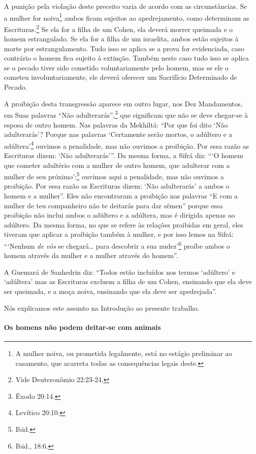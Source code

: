 A punição pela violação deste preceito varia de acordo com as
circunstâncias. Se a mulher for noiva\footnote{A mulher noiva, ou prometida legalmente, está no estágio preliminar ao casamento, que acarreta todas as consequências legais deste.} ambos ficam
sujeitos ao apedrejamento, como determinam as
Escrituras.\footnote{Vide Deuteronômio 22:23-24.} Se ela for a filha de um Cohen,
ela deverá morrer queimada e o homem estrangulado. Se ela for a filha de
um israelita, ambos estão sujeitos à morte por estrangulamento. Tudo
isso se aplica se a prova for evidenciada, caso contrário o homem fica
sujeito à extinção. Também neste caso tudo isso se aplica se o pecado
tiver sido cometido voluntariamente pelo homem, mas se ele o cometeu
involuntariamente, ele deverá oferecer um Sacrifício Determinado de
Pecado.

A proibição desta transgressão aparece em outro lugar, nos Dez
Mandamentos, em Suas palavras ``Não adulterarás'',\footnote{Êxodo 20:14.} que
significam que não se deve chegar-se à esposa de outro homem. Nas
palavras da Mekhiltá: ``Por que foi dito `Não adulterarás'? Porque nas
palavras `Certamente serão mortos, o adúltero e a adúltera'\footnote{Levítico
20:10.} ouvimos a penalidade, mas não ouvimos a proibição. Por essa razão
as Escrituras dizem: `Não adulterarás'''. Da mesma forma, a Sifrá diz:
```O homem que cometer adultério com a mulher de outro homem, que
adulterar com a mulher de seu próximo':\footnote{Ibid.} ouvimos aqui a
penalidade, mas não ouvimos a proibição. Por essa razão as Escrituras
dizem: `Não adulterarás' a ambos o homem e a mulher''. Eles não
encontraram a proibição nas palavras ``E com a mulher de teu
companheiro não te deitarás para dar sêmen'' porque essa proibição não
inclui ambos o adúltero e a adúltera, mas é dirigida apenas ao adúltero.
Da mesma forma, no que se refere às relações proibidas em geral, eles
tiveram que aplicar a proibição também à mulher, e por isso lemos na
Sifrá: ```Nenhum \emph{de vós} se chegará\ldots{} para descobrir a sua
nudez'\footnote{Ibid., 18:6.} proíbe ambos o homem através da mulher e a mulher
através do homem''.

A Guemará de Sanhedrin diz: ``Todos estão incluídos nos termos
`adúltero' e `adúltera' mas as Escrituras excluem a filha de um Cohen,
ensinando que ela deve ser queimada, e a moça noiva, ensinando que ela
deve ser apedrejada''.

Nós explicamos este assunto na Introdução ao presente trabalho.


\paragraph{Os homens não podem deitar-se com animais}

